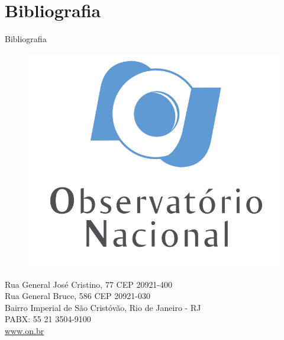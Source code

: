 \documentclass[10pt]{beamer} %
\newcommand{\nologo}{\setbeamertemplate{logo}{}} %
\begin{document}
\section{Bibliografia}
	\begin{frame}[allowframebreaks]{Bibliografia}
	\beamertemplatetextbibitems
	\tiny
	
	
	\end{frame}

\makeatother
{\nologo
\begin{frame}
\begin{figure}
\includegraphics[scale=0.25]{Imagens/logonvertical.jpg}
\end{figure}
\begin{center}
\begin{minipage}{0.77\textwidth}
\small
\begin{center}
Rua General José Cristino, 77 CEP 20921-400\\
Rua General Bruce, 586 CEP 20921-030\\
Bairro Imperial de São Cristóvão, Rio de Janeiro - RJ\\
PABX: 55 21 3504-9100\\
\url{www.on.br}
\end{center}
\end{minipage}
\end{center}
\end{frame}
}
\end{document}
